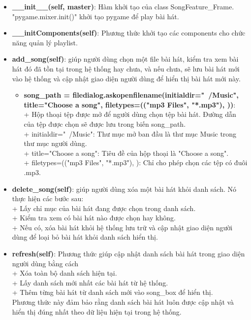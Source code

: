\documentclass[a4paper]{article}
\begin{document}
\begin{itemize}
    \item \textbf{\_\_init\_\_(self, master)}: Hàm khởi tạo của class SongFeature\_Frame. "pygame.mixer.init()" khởi tạo pygame để play bài hát. 
    \item \textbf{\_\_initComponents(self)}: Phương thức khởi tạo các components cho chức năng quản lý playlist.
    \item \textbf{add\_song(self)}: giúp người dùng chọn một file bài hát, kiểm tra xem bài hát đó đã tồn tại trong hệ thống hay chưa, và nếu chưa, sẽ lưu bài hát mới vào hệ thống và cập nhật giao diện người dùng để hiển thị bài hát mới này.
    \begin{itemize}
        \item \textbf{song\_path = filedialog.askopenfilename(initialdir="~/Music", title="Choose a song", filetypes=(("mp3 Files", "*.mp3"), ))}: \\
        + Hộp thoại tệp được mở để người dùng chọn tệp bài hát. Đường dẫn của tệp được chọn sẽ được lưu trong biến song\_path. \\
        + initialdir="~/Music": Thư mục mở ban đầu là thư mục Music trong thư mục người dùng. \\
        + title="Choose a song": Tiêu đề của hộp thoại là "Choose a song". \\
        + filetypes=(("mp3 Files", "*.mp3"), ): Chỉ cho phép chọn các tệp có đuôi .mp3.
    \end{itemize}
    \item \textbf{delete\_song(self)}: giúp người dùng xóa một bài hát khỏi danh sách. Nó thực hiện các bước sau: \\
    + Lấy chỉ mục của bài hát đang được chọn trong danh sách. \\
    + Kiểm tra xem có bài hát nào được chọn hay không. \\
    + Nếu có, xóa bài hát khỏi hệ thống lưu trữ và cập nhật giao diện người dùng để loại bỏ bài hát khỏi danh sách hiển thị.
    \item \textbf{refresh(self)}: Phương thức giúp cập nhật danh sách bài hát trong giao diện người dùng bằng cách \\
    + Xóa toàn bộ danh sách hiện tại. \\
    + Lấy danh sách mới nhất các bài hát từ hệ thống. \\
    + Thêm từng bài hát từ danh sách mới vào song\_box để hiển thị. \\
    Phương thức này đảm bảo rằng danh sách bài hát luôn được cập nhật và hiển thị đúng nhất theo dữ liệu hiện tại trong hệ thống.

\end{itemize}
\end{document}

